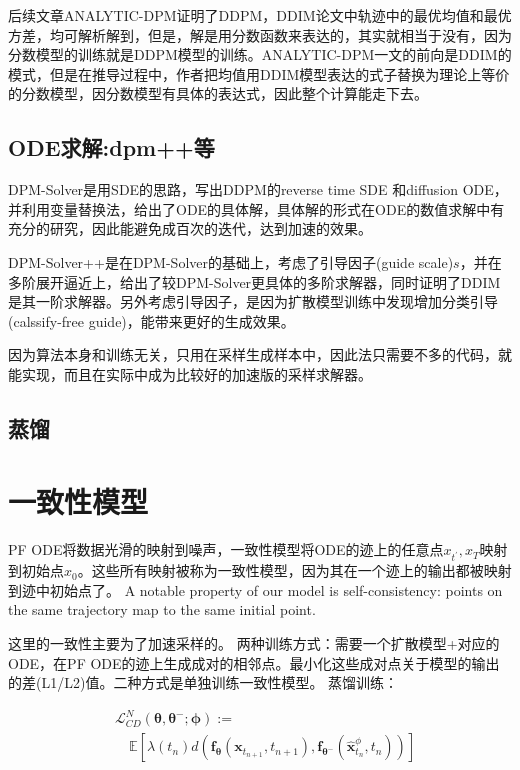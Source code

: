 \documentclass[lang=cn,newtx,10pt,scheme=chinese]{elegantbook}
\begin{document}
后续文章ANALYTIC-DPM证明了DDPM，DDIM论文中轨迹中的最优均值和最优方差，均可解析解到，但是，解是用分数函数来表达的，其实就相当于没有，因为分数模型的训练就是DDPM模型的训练。ANALYTIC-DPM一文的前向是DDIM的模式，但是在推导过程中，作者把均值用DDIM模型表达的式子替换为理论上等价的分数模型，因分数模型有具体的表达式，因此整个计算能走下去。

\subsection{ODE求解:dpm++等}
DPM-Solver是用SDE的思路，写出DDPM的reverse time SDE 和diffusion  ODE，并利用变量替换法，给出了ODE的具体解，具体解的形式在ODE的数值求解中有充分的研究，因此能避免成百次的迭代，达到加速的效果。

DPM-Solver++是在DPM-Solver的基础上，考虑了引导因子(guide scale)$s$，并在多阶展开逼近上，给出了较DPM-Solver更具体的多阶求解器，同时证明了DDIM是其一阶求解器。另外考虑引导因子，是因为扩散模型训练中发现增加分类引导(calssify-free guide)，能带来更好的生成效果。

因为算法本身和训练无关，只用在采样生成样本中，因此法只需要不多的代码，就能实现，而且在实际中成为比较好的加速版的采样求解器。
\subsection{蒸馏}


\section{一致性模型}
PF ODE将数据光滑的映射到噪声，一致性模型将ODE的迹上的任意点$x_{t^{\prime}}, x_T$映射到初始点$x_0$。这些所有映射被称为一致性模型，因为其在一个迹上的输出都被映射到迹中初始点了。 A notable property of our model is self-consistency: points on the same trajectory map to the same initial point.

这里的一致性主要为了加速采样的。
两种训练方式：需要一个扩散模型+对应的ODE，在PF ODE的迹上生成成对的相邻点。最小化这些成对点关于模型的输出的差(L1/L2)值。二种方式是单独训练一致性模型。
蒸馏训练：

$$\begin{aligned} & \mathcal{L}_{C D}^N\left(\boldsymbol{\theta}, \boldsymbol{\theta}^{-} ; \boldsymbol{\phi}\right):= \\ & \quad \mathbb{E}\left[\lambda\left(t_n\right) d\left(\boldsymbol{f}_{\boldsymbol{\theta}}\left(\mathbf{x}_{t_{n+1}}, t_{n+1}\right), \boldsymbol{f}_{\boldsymbol{\theta}^{-}}\left(\hat{\mathbf{x}}_{t_n}^\phi, t_n\right)\right)\right]\end{aligned}$$
\end{document}
